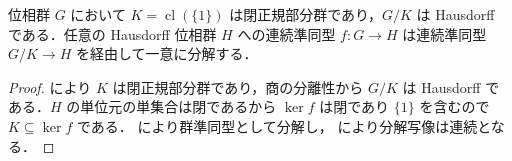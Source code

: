 \begin{prop}[単位元の閉包とHausdorff商]
位相群 $G$ において $K=\operatorname{cl}(\{1\})$ は閉正規部分群であり，$G/K$ は Hausdorff である．任意の Hausdorff 位相群 $H$ への連続準同型 $f:G\to H$ は連続準同型 $G/K\to H$ を経由して一意に分解する．
\end{prop}
\begin{proof}
 により $K$ は閉正規部分群であり，商の分離性から $G/K$ は Hausdorff である．$H$ の単位元の単集合は閉であるから $\ker f$ は閉であり $\{1\}$ を含むので $K\subseteq\ker f$ である． により群準同型として分解し， により分解写像は連続となる．
\end{proof}
